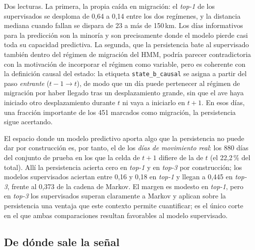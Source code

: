 Dos lecturas. La primera, la propia caída en migración: el \textit{top-1} de los
supervisados se desploma de 0,64 a 0,14 entre los dos regímenes, y la distancia
mediana cuando fallan se dispara de 23 a más de 150\,km. Los días informativos para
la predicción son la minoría y son precisamente donde el modelo pierde casi toda su
capacidad predictiva. La segunda, que la persistencia bate al supervisado también
dentro del régimen de migración del HMM, podría parecer contradictoria con la
motivación de incorporar el régimen como variable, pero es coherente con la
definición causal del estado: la etiqueta \texttt{state\_b\_causal} se asigna a
partir del paso \emph{entrante} ($t\!-\!1 \to t$), de modo que un día puede
pertenecer al régimen de migración por haber llegado tras un desplazamiento grande,
sin que el ave haya iniciado otro desplazamiento durante $t$ ni vaya a iniciarlo en
$t+1$. En esos días, una fracción importante de los 451 marcados como migración, la
persistencia sigue acertando.

El espacio donde un modelo predictivo aporta algo que la persistencia no puede dar
por construcción es, por tanto, el de los \emph{días de movimiento real}: los 880
días del conjunto de prueba en los que la celda de $t+1$ difiere de la de $t$
(el 22,2\,\% del total). Allí la persistencia acierta cero en \textit{top-1} y
en \textit{top-3} por construcción; los modelos supervisados aciertan entre 0,16 y
0,18 en \textit{top-1} y llegan a 0,445 en \textit{top-3}, frente al 0,373 de la
cadena de Markov. El margen es modesto en \textit{top-1}, pero en \textit{top-3}
los supervisados superan claramente a Markov y aplican sobre la persistencia una
ventaja que este contexto permite cuantificar; es el único corte en el que ambas
comparaciones resultan favorables al modelo supervisado.

\subsection{De dónde sale la señal}
\label{sec:o4-cat-importancia}

